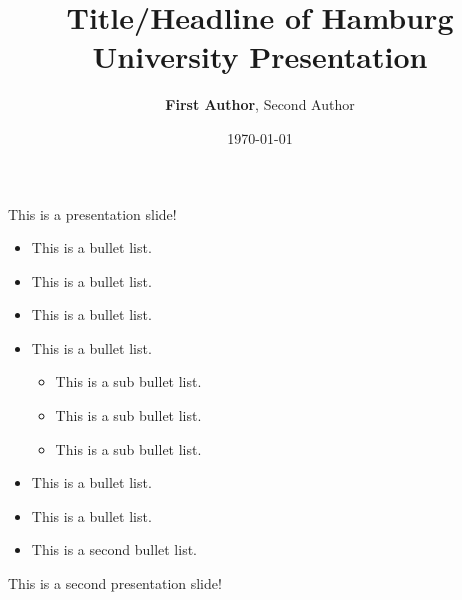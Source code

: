 \documentclass[aspectratio=169,17pt]{tuhh_presentation}
\title{Title/Headline of Hamburg University Presentation}
\date{\today}
\author{\textbf{First Author}, Second Author}
\begin{document}
\titlepage

\begin{frame}{This is a presentation slide!}
    \begin{minipage}{0.49\textwidth}
        \begin{itemize}
            \item This is a bullet list.
            \item This is a bullet list.
            \item This is a bullet list.
            \item This is a bullet list.

            \begin{itemize}
                \item This is a sub bullet list.
                \item This is a sub bullet list.
                \item This is a sub bullet list.
            \end{itemize}
            \item This is a bullet list.
            \item This is a bullet list.
        \end{itemize}
    \end{minipage}
    \begin{minipage}{0.49\textwidth}
        \begin{itemize}
            \item This is a second bullet list.
        \end{itemize}
    \end{minipage}
\end{frame}

\begin{frame}{This is a second presentation slide!}




\end{frame}
\end{document}
